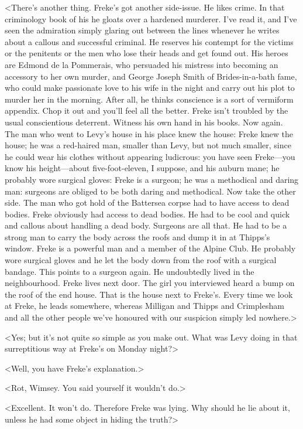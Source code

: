 <There's another thing. Freke's got another side-issue. He likes crime. In that criminology book of his he gloats over a hardened murderer. I've read it, and I've seen the admiration simply glaring out between the lines whenever he writes about a callous and successful criminal. He reserves his contempt for the victims or the penitents or the men who lose their heads and get found out. His heroes are Edmond de la Pommerais, who persuaded his mistress into becoming an accessory to her own murder, and George Joseph Smith of Brides-in-a-bath fame, who could make passionate love to his wife in the night and carry out his plot to murder her in the morning. After all, he thinks conscience is a sort of vermiform appendix. Chop it out and you'll feel all the better. Freke isn't troubled by the usual conscientious deterrent. Witness his own hand in his books. Now again. The man who went to Levy's house in his place knew the house: Freke knew the house; he was a red-haired man, smaller than Levy, but not much smaller, since he could wear his clothes without appearing ludicrous: you have seen Freke—you know his height—about five-foot-eleven, I suppose, and his auburn mane; he probably wore surgical gloves: Freke is a surgeon; he was a methodical and daring man: surgeons are obliged to be both daring and methodical. Now take the other side. The man who got hold of the Battersea corpse had to have access to dead bodies. Freke obviously had access to dead bodies. He had to be cool and quick and callous about handling a dead body. Surgeons are all that. He had to be a strong man to carry the body across the roofs and dump it in at Thipps's window. Freke is a powerful man and a member of the Alpine Club. He probably wore surgical gloves and he let the body down from the roof with a surgical bandage. This points to a surgeon again. He undoubtedly lived in the neighbourhood. Freke lives next door. The girl you interviewed heard a bump on the roof of the end house. That is the house next to Freke's. Every time we look at Freke, he leads somewhere, whereas Milligan and Thipps and Crimplesham and all the other people we've honoured with our suspicion simply led nowhere.>

<Yes; but it's not quite so simple as you make out. What was Levy doing in that surreptitious way at Freke's on Monday night?>

<Well, you have Freke's explanation.>

<Rot, Wimsey. You said yourself it wouldn't do.>

<Excellent. It won't do. Therefore Freke was lying. Why should he lie about it, unless he had some object in hiding the truth?>

